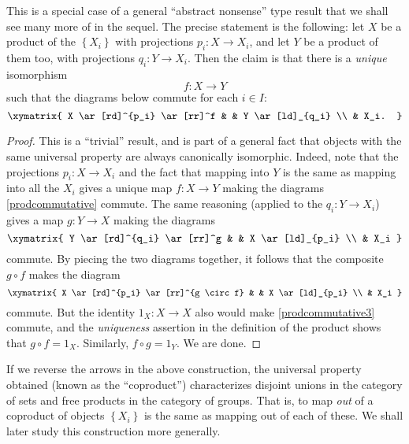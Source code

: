 This is a special case of a general ``abstract nonsense'' type result that we
shall see many more of in the sequel.
The precise statement is the following: let $X$ be a product of the
$\left\{X_i\right\}$ with projections $p_i : X \to X_i$, and let $Y$ be a
product of them too, with projections $q_i: Y \to X_i$. 
Then the claim is that there is a \emph{unique} isomorphism
\[ f: X \to Y  \]
such that the diagrams below commute for each $i \in I$:
\begin{equation} \label{prodcommutative} \xymatrix{
X \ar[rd]^{p_i}  \ar[rr]^f &  & Y \ar[ld]_{q_i} \\
& X_i. 
}\end{equation}
\begin{proof} 
This is a ``trivial'' result, and is part of a general fact that objects
with the same universal property are always canonically isomorphic. Indeed, note that the projections $p_i: X \to
X_i$ and the fact that mapping into $Y$ is the same as mapping into all the
$X_i$ gives a unique map $f: X \to Y$ making the diagrams
\eqref{prodcommutative} commute. The same reasoning (applied to the $q_i: Y \to
X_i$) gives a map $g:  Y \to X$ making the diagrams
\begin{equation} \label{prodcommutative2} \xymatrix{
Y \ar[rd]^{q_i}  \ar[rr]^g &  & X \ar[ld]_{p_i} \\
& X_i 
}\end{equation}
commute. By piecing the two diagrams together, it follows that the composite $g \circ f$ makes the diagram
\begin{equation} \label{prodcommutative3} \xymatrix{
X \ar[rd]^{p_i}  \ar[rr]^{g \circ f} &  & X \ar[ld]_{p_i} \\
& X_i 
}\end{equation}
commute. 
But the identity $1_X: X \to X$ also would make \eqref{prodcommutative3}
commute, and the \emph{uniqueness} assertion in the definition of the product
shows that $g \circ f = 1_X$. Similarly, $f \circ g = 1_Y$. We are done.
\end{proof} 
\begin{remark}
 If we reverse the arrows in the above construction, 
the universal property obtained (known as the ``coproduct'') characterizes
disjoint unions in the category of sets and free products in the category of
groups.
That is, to map \emph{out} of a  coproduct of objects $\left\{X_i\right\}$ is the same as
mapping out of each of these. We shall later study this construction more
generally.
\end{remark}


